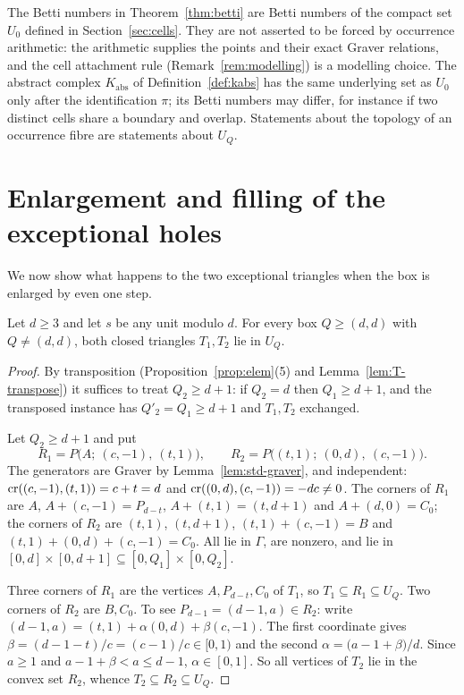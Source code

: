 \begin{remark}\label{rem:topology-scope}
The Betti numbers in Theorem~\ref{thm:betti} are Betti numbers of the compact set $U_0$ defined in Section~\ref{sec:cells}. They are not asserted to be forced by occurrence arithmetic: the arithmetic supplies the points and their exact Graver relations, and the cell attachment rule (Remark~\ref{rem:modelling}) is a modelling choice. The abstract complex $K_{\mathrm{abs}}$ of Definition~\ref{def:kabs} has the same underlying set as $U_0$ only after the identification $\pi$; its Betti numbers may differ, for instance if two distinct cells share a boundary and overlap. Statements about the topology of an occurrence fibre are statements about $U_Q$.
\end{remark}

\section{Enlargement and filling of the exceptional holes}\label{sec:fill}

We now show what happens to the two exceptional triangles when the box is enlarged by even one step.

\begin{proposition}\label{prop:fill}
Let $d\ge3$ and let $s$ be any unit modulo $d$. For every box $Q\ge(d,d)$ with $Q\ne(d,d)$, both closed triangles $T_1,T_2$ lie in $U_Q$.
\end{proposition}
\begin{proof}
By transposition (Proposition~\ref{prop:elem}(5) and Lemma~\ref{lem:T-transpose}) it suffices to treat $Q_2\ge d+1$: if $Q_2=d$ then $Q_1\ge d+1$, and the transposed instance has $Q'_2=Q_1\ge d+1$ and $T_1,T_2$ exchanged.

Let $Q_2\ge d+1$ and put
\[
  R_1=P\bigl(A;\ (c,-1),\ (t,1)\bigr),\qquad R_2=P\bigl((t,1);\ (0,d),\ (c,-1)\bigr).
\]
The generators are Graver by Lemma~\ref{lem:std-graver}, and independent: $\operatorname{cr}((c,-1),(t,1))=c+t=d$ and $\operatorname{cr}((0,d),(c,-1))=-dc\ne0$. The corners of $R_1$ are $A$, $A+(c,-1)=P_{d-t}$, $A+(t,1)=(t,d+1)$ and $A+(d,0)=C_0$; the corners of $R_2$ are $(t,1)$, $(t,d+1)$, $(t,1)+(c,-1)=B$ and $(t,1)+(0,d)+(c,-1)=C_0$. All lie in $\Gamma$, are nonzero, and lie in $[0,d]\times[0,d+1]\subseteq[0,Q_1]\times[0,Q_2]$.

Three corners of $R_1$ are the vertices $A,P_{d-t},C_0$ of $T_1$, so $T_1\subseteq R_1\subseteq U_Q$. Two corners of $R_2$ are $B,C_0$. To see $P_{d-1}=(d-1,a)\in R_2$: write $(d-1,a)=(t,1)+\alpha(0,d)+\beta(c,-1)$. The first coordinate gives $\beta=(d-1-t)/c=(c-1)/c\in[0,1)$ and the second $\alpha=\bigl(a-1+\beta\bigr)/d$. Since $a\ge1$ and $a-1+\beta<a\le d-1$, $\alpha\in[0,1]$. So all vertices of $T_2$ lie in the convex set $R_2$, whence $T_2\subseteq R_2\subseteq U_Q$.
\end{proof}

